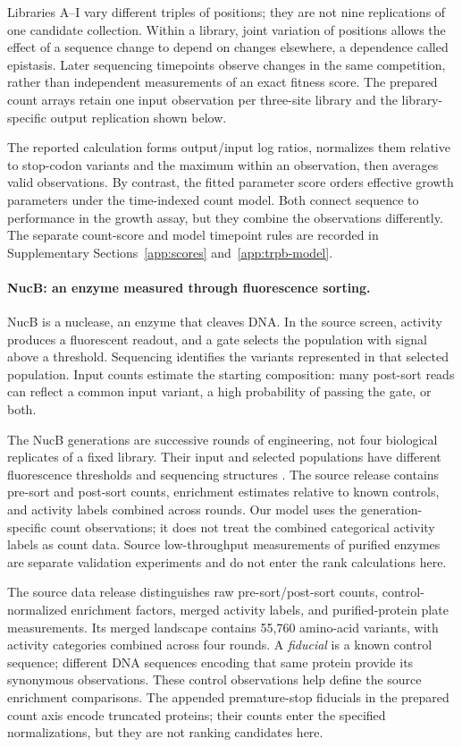 Libraries A--I vary different triples of positions; they are not nine
replications of one candidate collection. Within a library, joint
variation of positions allows the effect of a sequence change to depend
on changes elsewhere, a dependence called epistasis. Later sequencing
timepoints observe changes in the same competition, rather than
independent measurements of an exact fitness score. The prepared count
arrays retain one input observation per three-site library and the
library-specific output replication shown below.

The reported calculation forms output/input log ratios, normalizes
them relative to stop-codon variants and the maximum within an
observation, then averages valid observations. By contrast, the fitted
parameter score orders effective growth parameters under the time-indexed
count model. Both connect sequence to performance in the growth assay,
but they combine the observations differently. The separate count-score
and model timepoint rules are recorded in Supplementary
Sections~\ref{app:scores} and~\ref{app:trpb-model}.

\paragraph{NucB: an enzyme measured through fluorescence sorting.}
NucB is a nuclease, an enzyme that cleaves DNA. In the source screen,
activity produces a fluorescent readout, and a gate selects the
population with signal above a threshold. Sequencing identifies the
variants represented in that selected population. Input counts estimate
the starting composition: many post-sort reads can reflect a common
input variant, a high probability of passing the gate, or both.

The NucB generations are successive rounds of engineering, not four biological
replicates of a fixed library. Their input and selected populations have
different fluorescence thresholds and sequencing structures
\citep{thomas2025}. The source release contains pre-sort and post-sort counts,
enrichment estimates relative to known controls, and activity labels combined
across rounds. Our model uses the generation-specific count observations;
it does not treat the combined categorical activity labels as count data.
Source low-throughput measurements of purified enzymes are separate validation
experiments and do not enter the rank calculations here.

The source data release distinguishes raw pre-sort/post-sort counts,
control-normalized enrichment factors, merged activity labels, and
purified-protein plate measurements. Its merged landscape contains
55,760 amino-acid variants, with activity categories combined across
four rounds. A \emph{fiducial} is a known control sequence; different
DNA sequences encoding that same protein provide its synonymous
observations. These control observations help define the source
enrichment comparisons. The appended premature-stop fiducials in the
prepared count axis encode truncated proteins; their counts enter the
specified normalizations, but they are not ranking candidates here.

